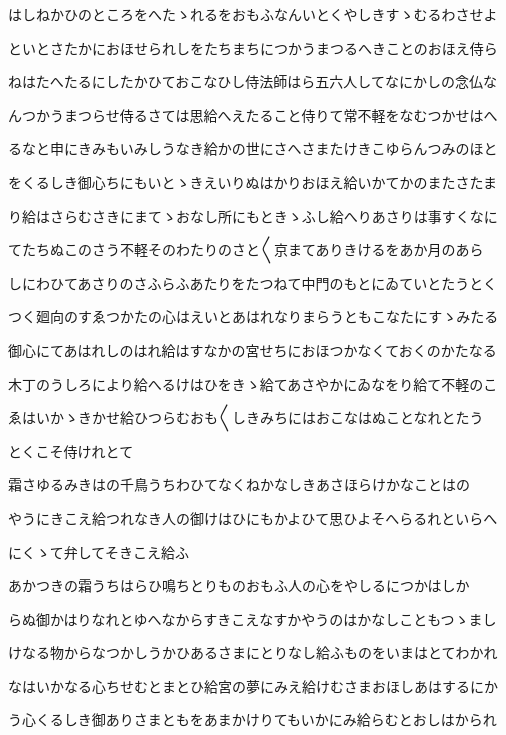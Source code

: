 \documentclass[a4paper,11pt,landscape]{ltjtarticle}
\begin{document}
\par\medskip
はしねかひのところをへたゝれるをおもふなんいとくやしきすゝむるわさせよ
\par\medskip
といとさたかにおほせられしをたちまちにつかうまつるへきことのおほえ侍ら
\par\medskip
ねはたへたるにしたかひておこなひし侍法師はら五六人してなにかしの念仏な
\par\medskip
んつかうまつらせ侍るさては思給へえたること侍りて常不軽をなむつかせはへ
\par\medskip
るなと申にきみもいみしうなき給かの世にさへさまたけきこゆらんつみのほと
\par\medskip
をくるしき御心ちにもいとゝきえいりぬはかりおほえ給いかてかのまたさたま
\par\medskip
り給はさらむさきにまてゝおなし所にもときゝふし給へりあさりは事すくなに
\par\medskip
てたちぬこのさう不軽そのわたりのさと〱京まてありきけるをあか月のあら
\par\medskip
しにわひてあさりのさふらふあたりをたつねて中門のもとにゐていとたうとく
\par\medskip
つく廻向のすゑつかたの心はえいとあはれなりまらうともこなたにすゝみたる
\par\medskip
御心にてあはれしのはれ給はすなかの宮せちにおほつかなくておくのかたなる
\par\medskip
木丁のうしろにより給へるけはひをきゝ給てあさやかにゐなをり給て不軽のこ
\par\medskip
ゑはいかゝきかせ給ひつらむおも〱しきみちにはおこなはぬことなれとたう
\par\medskip
とくこそ侍けれとて
\par\medskip
霜さゆるみきはの千鳥うちわひてなくねかなしきあさほらけかなことはの
\par\medskip
やうにきこえ給つれなき人の御けはひにもかよひて思ひよそへらるれといらへ
\par\medskip
にくゝて弁してそきこえ給ふ
\par\medskip
あかつきの霜うちはらひ鳴ちとりものおもふ人の心をやしるにつかはしか
\par\medskip
らぬ御かはりなれとゆへなからすきこえなすかやうのはかなしこともつゝまし
\par\medskip
けなる物からなつかしうかひあるさまにとりなし給ふものをいまはとてわかれ
\par\medskip
なはいかなる心ちせむとまとひ給宮の夢にみえ給けむさまおほしあはするにか
\par\medskip
う心くるしき御ありさまともをあまかけりてもいかにみ給らむとおしはかられ
\end{document}
